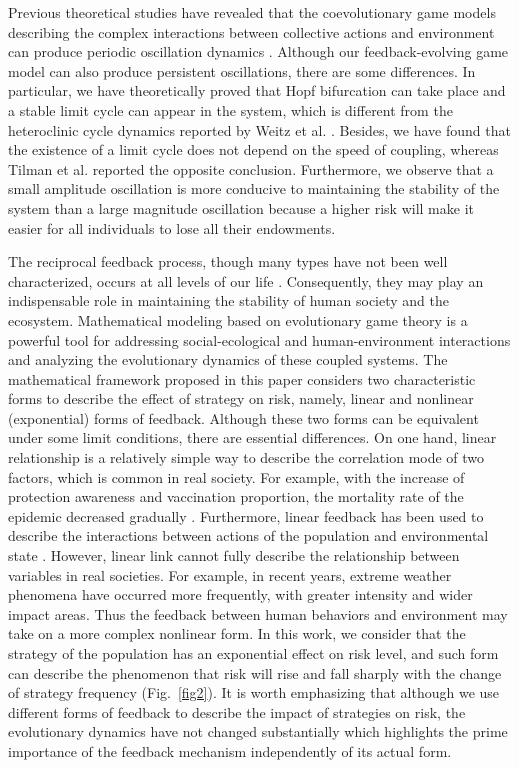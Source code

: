 \documentclass[9pt]{elife}
\begin{document}
Previous theoretical studies have revealed that the coevolutionary game models describing the complex interactions between collective actions and environment can produce periodic oscillation dynamics \citep{weitz2016oscillating,tilman2020evolutionary}. Although our feedback-evolving game model can also produce persistent oscillations, there are some differences. In particular, we have theoretically proved that Hopf bifurcation can take place and a stable limit cycle can appear in the system, which is different from the heteroclinic cycle dynamics reported by Weitz et al. \citep{weitz2016oscillating}. Besides, we have found that the existence of a limit cycle does not depend on the speed of coupling, whereas Tilman et al. \citep{tilman2020evolutionary} reported the opposite conclusion. Furthermore, we observe that a small amplitude oscillation is more conducive to maintaining the stability of the system than a large magnitude oscillation because a higher risk will make it easier for all individuals to lose all their endowments.

The reciprocal feedback process, though many types have not been well characterized, occurs at all levels of our life \citep{liu2007complexity,ezenwa2016host,obradovich2019risk}. Consequently, they may play an indispensable role in maintaining the stability of human society and the ecosystem. Mathematical modeling based on evolutionary game theory is a powerful tool for addressing social-ecological and human-environment interactions and analyzing the evolutionary dynamics of these coupled systems. The mathematical framework proposed in this paper considers two characteristic forms to describe the effect of strategy on risk, namely, linear and nonlinear (exponential) forms of feedback. Although these two forms can be equivalent under some limit conditions, there are essential differences. On one hand, linear relationship is a relatively simple way to describe the correlation mode of two factors, which is common in real society. For example, with the increase of protection awareness and vaccination proportion, the mortality rate of the epidemic decreased gradually \citep{yang2022covid}. Furthermore, linear feedback has been used to describe the interactions between actions of the population and environmental state \citep{weitz2016oscillating,tilman2020evolutionary}. However, linear link cannot fully describe the relationship between variables in real societies. For example, in recent years, extreme weather phenomena have occurred more frequently, with greater intensity and wider impact areas. Thus the feedback between human behaviors and environment may take on a more complex nonlinear form. In this work, we consider that the strategy of the population has an exponential effect on risk level, and such form can describe the phenomenon that risk will rise and fall sharply with the change of strategy frequency (Fig.~\ref{fig2}). It is worth emphasizing that although we use different forms of feedback to describe the impact of strategies on risk, the evolutionary dynamics have not changed substantially which highlights the prime importance of the feedback mechanism independently of its actual form.
\end{document}
